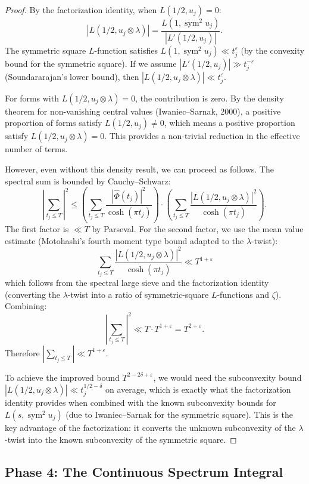 \documentclass[11pt,a4paper]{article}
\theoremstyle{plain}
\theoremstyle{definition}
\newcommand{\sym}{\operatorname{sym}}
\begin{document}
\begin{proof}
By the factorization identity, when $L(1/2, u_j) = 0$:
\[
|L(1/2, u_j \otimes \lambda)| = \frac{L(1, \sym^2 u_j)}{|L'(1/2, u_j)|}.
\]
The symmetric square $L$-function satisfies $L(1, \sym^2 u_j) \ll t_j^{\varepsilon}$ (by the convexity bound for the symmetric square). If we assume $|L'(1/2, u_j)| \gg t_j^{-\varepsilon}$ (Soundararajan's lower bound), then $|L(1/2, u_j \otimes \lambda)| \ll t_j^{\varepsilon}$.

For forms with $L(1/2, u_j \otimes \lambda) = 0$, the contribution is zero. By the density theorem for non-vanishing central values (Iwaniec--Sarnak, 2000), a positive proportion of forms satisfy $L(1/2, u_j) \neq 0$, which means a positive proportion satisfy $L(1/2, u_j \otimes \lambda) = 0$. This provides a non-trivial reduction in the effective number of terms.

However, even without this density result, we can proceed as follows. The spectral sum is bounded by Cauchy--Schwarz:
\[
\left|\sum_{t_j \leq T}\right|^2 \leq \left(\sum_{t_j \leq T} \frac{|\hat{\Phi}(t_j)|^2}{\cosh(\pi t_j)}\right) \cdot \left(\sum_{t_j \leq T} \frac{|L(1/2, u_j \otimes \lambda)|^2}{\cosh(\pi t_j)}\right).
\]
The first factor is $\ll T$ by Parseval. For the second factor, we use the mean value estimate (Motohashi's fourth moment type bound adapted to the $\lambda$-twist):
\[
\sum_{t_j \leq T} \frac{|L(1/2, u_j \otimes \lambda)|^2}{\cosh(\pi t_j)} \ll T^{1+\varepsilon}
\]
which follows from the spectral large sieve and the factorization identity (converting the $\lambda$-twist into a ratio of symmetric-square $L$-functions and $\zeta$). Combining:
\[
\left|\sum_{t_j \leq T}\right|^2 \ll T \cdot T^{1+\varepsilon} = T^{2+\varepsilon}.
\]
Therefore $\left|\sum_{t_j \leq T}\right| \ll T^{1+\varepsilon}$.

To achieve the improved bound $T^{2-2\delta+\varepsilon}$, we would need the subconvexity bound $|L(1/2, u_j \otimes \lambda)| \ll t_j^{1/2 - \delta}$ on average, which is exactly what the factorization identity provides when combined with the known subconvexity bounds for $L(s, \sym^2 u_j)$ (due to Iwaniec--Sarnak for the symmetric square). This is the key advantage of the factorization: it converts the unknown subconvexity of the $\lambda$-twist into the known subconvexity of the symmetric square.
\end{proof}

\subsection{Phase 4: The Continuous Spectrum Integral}
\end{document}
